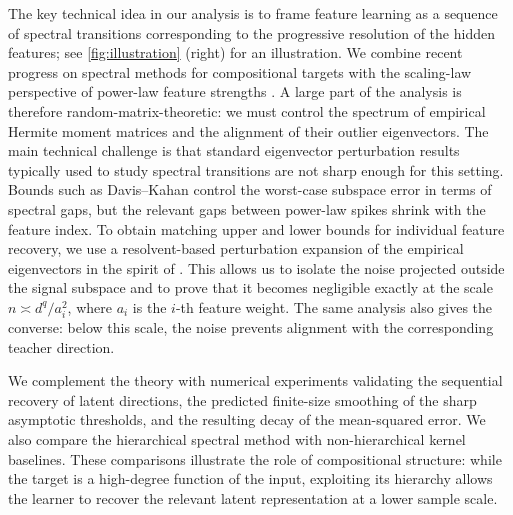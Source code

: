 \documentclass[]{article}
\numberwithin{equation}{section}
\theoremstyle{definition}
\begin{document}
The key technical idea in our analysis is to frame feature learning as a sequence of spectral transitions corresponding to the progressive resolution of the hidden features; see \cref{fig:illustration} (right) for an illustration. We combine recent progress on spectral methods for compositional targets \citep{wang2023learning,nichani2024provable,fu2025learning,tabanelli2026deep} with the scaling-law perspective of power-law feature strengths \citep{defilippis2025scaling,ren2025emergence,defilippis2026optimal}. A large part of the analysis is therefore random-matrix-theoretic: we must control the spectrum of empirical Hermite moment matrices and the alignment of their outlier eigenvectors. The main technical challenge is that standard eigenvector perturbation results typically used to study spectral transitions are not sharp enough for this setting. Bounds such as Davis--Kahan \citep{davis1970rotation} control the worst-case subspace error in terms of spectral gaps, but the relevant gaps between power-law spikes shrink with the feature index. To obtain matching upper and lower bounds for individual feature recovery, we use a resolvent-based perturbation expansion of the empirical eigenvectors in the spirit of \citep{eldridge2018unperturbed,greenbaum2020first}. This allows us to isolate the noise projected outside the signal subspace and to prove that it becomes negligible exactly at the scale $n \asymp d^q/a_i^2$, where $a_{i}$ is the $i$-th feature weight. The same analysis also gives the converse: below this scale, the noise prevents alignment with the corresponding teacher direction.

We complement the theory with numerical experiments validating the sequential recovery of latent directions, the predicted finite-size smoothing of the sharp asymptotic thresholds, and the resulting decay of the mean-squared error. We also compare the hierarchical spectral method with non-hierarchical kernel baselines. These comparisons illustrate the role of compositional structure: while the target is a high-degree function of the input, exploiting its hierarchy allows the learner to recover the relevant latent representation at a lower sample scale.
\end{document}
